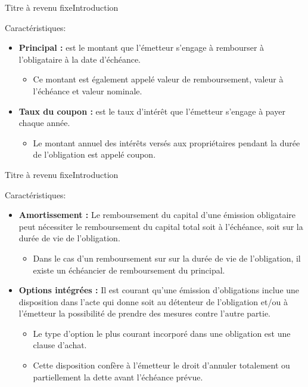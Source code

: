 \documentclass{beamer}
\begin{document}
\begin{frame}{Titre à revenu fixe}{Introduction}
\begin{block}{Caractéristiques:}
\begin{itemize}
\item \textbf{Principal :} est le montant que l'émetteur s'engage à rembourser à l'obligataire à la date d'échéance. 
\begin{itemize}
\item Ce montant est également appelé valeur de remboursement, valeur à l'échéance et valeur nominale.
\end{itemize}
\item \textbf{Taux du coupon :} est le taux d'intérêt que l'émetteur s'engage à payer chaque année.
\begin{itemize}
\item Le montant annuel des intérêts versés aux propriétaires pendant la durée de l'obligation est appelé coupon.
\end{itemize}
\end{itemize}
\end{block}
\end{frame}


\begin{frame}{Titre à revenu fixe}{Introduction}
\begin{block}{Caractéristiques:}
\begin{itemize}
\item \textbf{Amortissement :}
Le remboursement du capital d'une émission obligataire peut nécessiter le remboursement du capital total soit à l'échéance, soit sur la durée de vie de l'obligation. 
\begin{itemize}
\item Dans le cas d'un remboursement sur sur la durée de vie de l'obligation, il existe un échéancier de remboursement du principal.
\end{itemize}
\item \textbf{Options intégrées :} Il est courant qu'une émission d'obligations inclue une disposition dans l'acte qui donne soit au détenteur de l'obligation et/ou à l'émetteur la possibilité de prendre des mesures contre l'autre partie.
\begin{itemize}
\item Le type d'option le plus courant incorporé dans une obligation est une clause d'achat.
\item Cette disposition confère à l'émetteur le droit d'annuler totalement ou partiellement la dette avant l'échéance prévue.
\end{itemize}
\end{itemize}
\end{block}
\end{frame}
\end{document}
